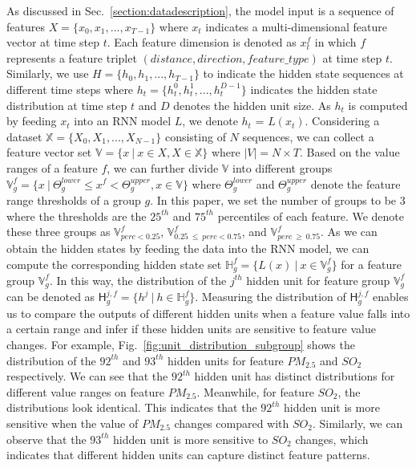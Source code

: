 As discussed in Sec.~\ref{section:datadescription}, the model input is a sequence of features $X=\{x_0, x_1, ..., x_{T-1}\}$ where $x_t$ indicates a multi-dimensional feature vector at time step $t$. 
Each feature dimension is denoted as $x_t^f$ in which $f$ represents a feature triplet $(distance, direction, feature\_type)$ at time step $t$.
Similarly, we use $H=\{h_0, h_1, ..., h_{T-1}\}$ to indicate the hidden state sequences at different time steps where $h_t = \{h_t^0, h_t^1, ..., h_t^{D-1}\}$ indicates the hidden state distribution at time step $t$ and $D$ denotes the hidden unit size.
As $h_t$ is computed by feeding $x_t$ into an RNN model $L$, we denote $h_t$ = $L(x_t)$.
Considering a dataset  $\mathbb{X} = \{X_0, X_1, ..., X_{N-1}\}$ consisting of $N$ sequences, we can collect a feature vector set $\mathbb{V} = \{x~|~x \in X, X \in \mathbb{X}\}$ where $|V| = N \times T$. 
Based on the value ranges of a feature $f$, we can further divide $\mathbb{V}$ into different groups $\mathbb{V}_g^{f}=\{x~|~\Theta_g^{lower} \leq x^f < \Theta_g^{upper}, x \in \mathbb{V}\}$ where $\Theta_g^{lower}$ and $\Theta_g^{upper}$ denote the feature range thresholds of a group $g$.
In this paper, we set the number of groups to be $3$ where the thresholds are the $25^{th}$ and $75^{th}$ percentiles of each feature.
We denote these three groups as $\mathbb{V}_{perc<0.25}^{f}$, $\mathbb{V}_{0.25~\leq~perc<0.75}^{f}$, and $\mathbb{V}_{perc~\geq~0.75}^{f}$. 
As we can obtain the hidden states by feeding the data into the RNN model, we can compute the corresponding hidden state set $\mathbb{H}_g^{f} = \{L(x)~|~x \in \mathbb{V}_g^{f}\}$ for a feature group $\mathbb{V}_g^{f}$.
In this way, the distribution of the $j^{th}$ hidden unit for feature group $\mathbb{V}_g^{f}$ can be denoted as $\mathsf{H}_g^{j, f}=\{h^j~|~h \in \mathbb{H}_g^{f}\}$.
Measuring the distribution of $\mathsf{H}_g^{j, f}$ enables us to compare the outputs of different hidden units when a feature value falls into a certain range and infer if these hidden units are sensitive to feature value changes.
For example, Fig.~\ref{fig:unit_distribution_subgroup} shows the distribution of the $92^{th}$ and $93^{th}$ hidden units for feature $PM_{2.5}$ and $SO_2$ respectively.
We can see that the $92^{th}$ hidden unit has distinct distributions for different value ranges on feature $PM_{2.5}$.
Meanwhile, for feature $SO_2$, the distributions look identical.
This indicates that the $92^{th}$ hidden unit is more sensitive when the value of $PM_{2.5}$ changes compared with $SO_2$.
Similarly, we can observe that the $93^{th}$ hidden unit is more sensitive to $SO_2$ changes, which indicates that different hidden units can capture distinct feature patterns.


